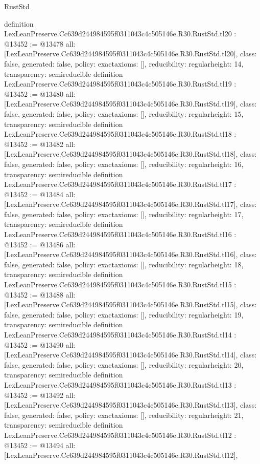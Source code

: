 \begin{lexlean}{RustStd}
\begin{coremodule}
{}
definition LexLeanPreserve.Cc639d244984595f0311043c4c505146e.R30.RustStd.tl20 : @13452 := @13478 {
  all: [LexLeanPreserve.Cc639d244984595f0311043c4c505146e.R30.RustStd.tl20],
  class: false,
  generated: false,
  policy: exact{axioms: []},
  reducibility: regular{height: 14},
  transparency: semireducible
}
definition LexLeanPreserve.Cc639d244984595f0311043c4c505146e.R30.RustStd.tl19 : @13452 := @13480 {
  all: [LexLeanPreserve.Cc639d244984595f0311043c4c505146e.R30.RustStd.tl19],
  class: false,
  generated: false,
  policy: exact{axioms: []},
  reducibility: regular{height: 15},
  transparency: semireducible
}
definition LexLeanPreserve.Cc639d244984595f0311043c4c505146e.R30.RustStd.tl18 : @13452 := @13482 {
  all: [LexLeanPreserve.Cc639d244984595f0311043c4c505146e.R30.RustStd.tl18],
  class: false,
  generated: false,
  policy: exact{axioms: []},
  reducibility: regular{height: 16},
  transparency: semireducible
}
definition LexLeanPreserve.Cc639d244984595f0311043c4c505146e.R30.RustStd.tl17 : @13452 := @13484 {
  all: [LexLeanPreserve.Cc639d244984595f0311043c4c505146e.R30.RustStd.tl17],
  class: false,
  generated: false,
  policy: exact{axioms: []},
  reducibility: regular{height: 17},
  transparency: semireducible
}
definition LexLeanPreserve.Cc639d244984595f0311043c4c505146e.R30.RustStd.tl16 : @13452 := @13486 {
  all: [LexLeanPreserve.Cc639d244984595f0311043c4c505146e.R30.RustStd.tl16],
  class: false,
  generated: false,
  policy: exact{axioms: []},
  reducibility: regular{height: 18},
  transparency: semireducible
}
definition LexLeanPreserve.Cc639d244984595f0311043c4c505146e.R30.RustStd.tl15 : @13452 := @13488 {
  all: [LexLeanPreserve.Cc639d244984595f0311043c4c505146e.R30.RustStd.tl15],
  class: false,
  generated: false,
  policy: exact{axioms: []},
  reducibility: regular{height: 19},
  transparency: semireducible
}
definition LexLeanPreserve.Cc639d244984595f0311043c4c505146e.R30.RustStd.tl14 : @13452 := @13490 {
  all: [LexLeanPreserve.Cc639d244984595f0311043c4c505146e.R30.RustStd.tl14],
  class: false,
  generated: false,
  policy: exact{axioms: []},
  reducibility: regular{height: 20},
  transparency: semireducible
}
definition LexLeanPreserve.Cc639d244984595f0311043c4c505146e.R30.RustStd.tl13 : @13452 := @13492 {
  all: [LexLeanPreserve.Cc639d244984595f0311043c4c505146e.R30.RustStd.tl13],
  class: false,
  generated: false,
  policy: exact{axioms: []},
  reducibility: regular{height: 21},
  transparency: semireducible
}
definition LexLeanPreserve.Cc639d244984595f0311043c4c505146e.R30.RustStd.tl12 : @13452 := @13494 {
  all: [LexLeanPreserve.Cc639d244984595f0311043c4c505146e.R30.RustStd.tl12],
}
\end{coremodule}
\end{lexlean}
